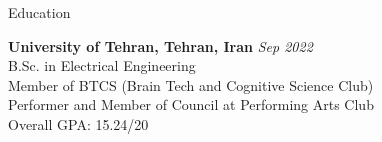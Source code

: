 \documentclass[
	11pt, %
]{resume} %
\begin{document}

\begin{rSection}{Education}
	
	\textbf{University of Tehran, Tehran, Iran} \hfill \textit{Sep 2022} \\ 
	B.Sc. in Electrical Engineering \\
	Member of BTCS (Brain Tech and Cognitive Science Club) \\
	Performer and Member of Council at Performing Arts Club\\
	Overall GPA: 15.24/20
	
\end{rSection}

\end{document}
